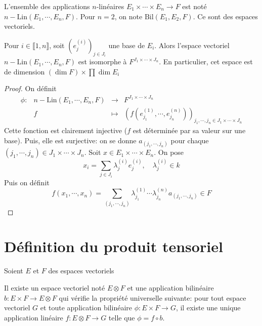 \begin{dfn}[Notation]
    L'ensemble des applications $n$-linéaires $E_1\times \cdots \times E_n \longrightarrow F$ est noté $n-\mathrm{Lin}(E_1, \cdots , E_n, F)$. Pour $n=2$, on note  $\mathrm{Bil}(E_1, E_2, F)$. Ce sont des espaces vectoriels.
\end{dfn}

\begin{prop}
    Pour $i \in  \llbracket 1, n \rrbracket $, soit $(e_j^{(i)})_{j \in  J_i}$ une base de $E_i$. Alors l'espace vectoriel $n-\mathrm{Lin}(E_1, \cdots , E_n, F)$ est isomorphe à $F^{J_1\times\cdots \times J_n}$. En particulier, cet espace est de dimension $(\dim F)\times \prod \dim E_i$
\end{prop}

\begin{proof}
On définit \[
\begin{array}{rrcl}
    \phi:& n-\mathrm{Lin}(E_1, \cdots , E_n, F) & \longrightarrow & F^{J_1\times\cdots \times J_n} \\
         & f & \longmapsto & \displaystyle (f(e_{j_1}^{(1)}, \cdots , e_{j_n}^{(n)}))_{j_1, \cdots , j_n \in  J_1\times \cdots \times J_n}
\end{array}
\]
Cette fonction est clairement injective ($f$ est déterminée par sa valeur sur une base). Puis, elle est surjective: on se donne  $a_{(j_1, \cdots , j_n)}$ pour chaque $(j_1, \cdots , j_n) \in  J_1\times \cdots \times J_n$. Soit $x \in  E_1\times \cdots \times E_n$. On pose \[
    x_i=\sum_{j \in  J_i}\lambda_j^{(i)}e_j^{(i)}, \quad  \lambda_j^{(i)} \in  k
\] 
Puis on définit \[
    f(x_1, \cdots , x_n)=\sum_{(j_1, \cdots , j_n)} \lambda_{j_1}^{(1)} \cdots \lambda_{j_n}^{(n)} a_{(j_1, \cdots , j_n)} \in  F
\] 
\end{proof}

\section{Définition du produit tensoriel}

Soient $E$ et  $F$ des espaces vectoriels 

\begin{thm}
Il existe un espace vectoriel noté $E \otimes F$ et une application bilinéaire  $b:E\times F \longrightarrow E\otimes F$ qui vérifie la propriété universelle suivante: pour tout espace vectoriel $G$ et toute application bilinéaire  $\phi:E\times F\longrightarrow G$, il existe une unique application linéaire $f:E\otimes F\longrightarrow G$ telle que $\phi=f\circ b$.

 \begin{center}
\end{center}
\end{thm}


